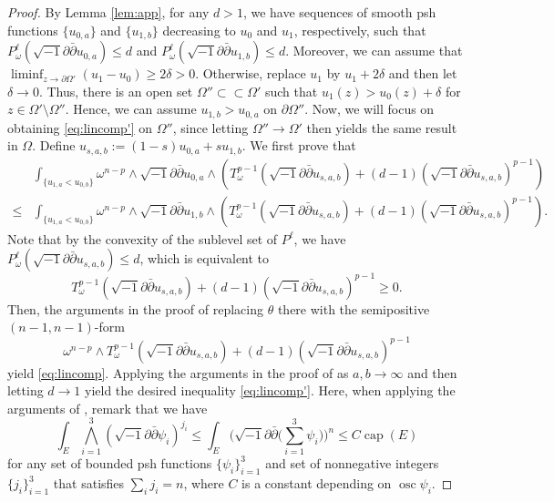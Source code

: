 \documentclass[10pt,a4paper]{amsart}
\numberwithin{equation}{section}
\newcommand{\delb}{\sqrt{-1}\partial\bar{\partial}}
\begin{document}
\begin{proof}
    By Lemma \ref{lem:app}, for any $d>1$, we have sequences of smooth psh functions $\{u_{0,a}\}$ and $\{u_{1,b}\}$ decreasing to $u_0$ and $u_1$, respectively, such that $P^{\ell}_\omega(\delb u_{0,a})\le d$ and $P^{\ell}_\omega(\delb u_{1,b})\le d$. Moreover, we can assume that $\liminf_{z\to\partial\Omega'}(u_1-u_0)\ge 2\delta>0$. Otherwise, replace $u_1$ by $u_1+2\delta$ and then let $\delta\to0$. Thus, there is an open set $\Omega''\subset\subset\Omega'$ such that $u_1(z)>u_0(z)+\delta$ for $z\in\Omega'\setminus\Omega''$. Hence, we can assume $u_{1,b}>u_{0,a}$ on $\partial\Omega''$. Now, we will focus on obtaining \eqref{eq:lincomp'} on $\Omega''$, since letting $\Omega''\to\Omega'$ then yields the same result in $\Omega$.
    Define $u_{s,a,b}:=(1-s)u_{0,a}+su_{1,b}$. 
    We first prove that 
    \begin{equation}\label{eq:lincomp}
        \begin{aligned}
            &\int_{\{u_{1,a}<u_{0,b}\}}\omega^{n-p}\wedge\delb u_{0,a}\wedge \left(T^{p-1}_{\omega}(\delb u_{s,a,b})+(d-1)(\delb u_{s,a,b})^{p-1}\right)\\
            \le&\int_{\{u_{1,a}<u_{0,b}\}}\omega^{n-p}\wedge\delb u_{1,b}\wedge \left(T^{p-1}_{\omega}(\delb u_{s,a,b})+(d-1)(\delb u_{s,a,b})^{p-1}\right).
        \end{aligned}
    \end{equation}
    Note that by the convexity of the sublevel set of $P^{\ell}$, we have $P^\ell_\omega(\delb u_{s,a,b})\le d$, which is equivalent to 
    $$T^{p-1}_\omega(\delb u_{s,a,b})+(d-1)(\delb u_{s,a,b})^{p-1}\ge0.$$ 
    Then, the arguments in the proof of \cite[Proposition 3.1]{BT'} replacing $\theta$ there with the semipositive $(n-1,n-1)$-form
    $$\omega^{n-p}\wedge T^{p-1}_\omega(\delb u_{s,a,b})+(d-1)(\delb u_{s,a,b})^{p-1}$$
    yield \eqref{eq:lincomp}. Applying the arguments in the proof of \cite[Theorem 4.1]{BT} as $a,b\to\infty$ and then letting $d\to1$ yield the desired inequality \eqref{eq:lincomp'}. Here, when applying the arguments of \cite[Theorem 4.1]{BT}, remark that we have
    $$\int_E \bigwedge_{i=1}^3(\delb\psi_i)^{j_i}\le \int_E \Big(\delb \Big(\sum_{i=1}^3\psi_i\Big)\Big)^n\le C \operatorname{cap}(E)$$
    for any set of bounded psh functions $\{\psi_i\}_{i=1}^3$ and set of nonnegative integers $\{j_i\}_{i=1}^3$ that satisfies $\sum_ij_i=n$,
    where $C$ is a constant depending on $\operatorname{osc}\psi_i$.
\end{proof}
\end{document}
